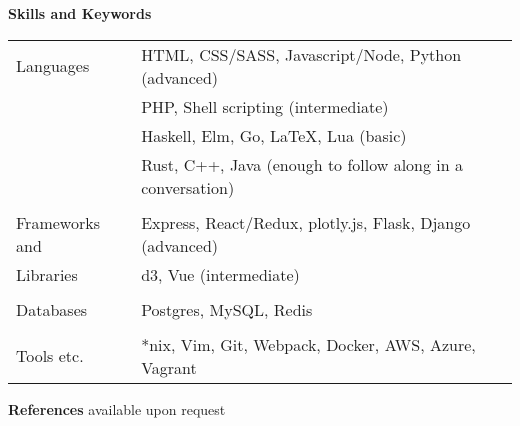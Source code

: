 \documentclass[10pt,notitlepage,oneside,draft]{article}
\begin{document}
\begin{flushleft}
  \large
  \textbf{Skills and Keywords} \\
  \vspace{12pt}
  \normalsize
  \begin{tabular}{ p{86pt} | l  }
      Languages & HTML, CSS/SASS, Javascript/Node, Python (advanced) \\
    & PHP, Shell scripting (intermediate) \\
    & Haskell, Elm, Go, LaTeX, Lua (basic) \\
    & Rust, C++, Java (enough to follow along in a conversation) \\
    & \\
    Frameworks and & Express, React/Redux, plotly.js, Flask, Django (advanced) \\
    Libraries & d3, Vue (intermediate) \\
    & \\
    Databases & Postgres, MySQL, Redis \\
    & \\
    Tools etc. & *nix, Vim\footnotemark[1], Git, Webpack, Docker, AWS, Azure, Vagrant 
  \end{tabular}
  \vspace{20pt}


  \large
  \textbf{References}
  \normalsize
  available upon request



\end{flushleft}
\end{document}
